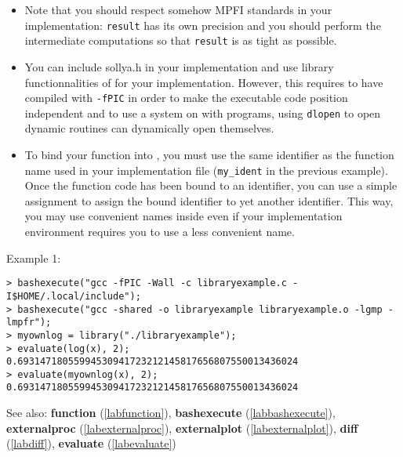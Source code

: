 \begin{itemize}
\item Note that you should respect somehow MPFI standards in your implementation:
   \verb|result| has its own precision and you should perform the 
   intermediate computations so that \verb|result| is as tight as possible.

\item You can include sollya.h in your implementation and use library 
   functionnalities of \sollya for your implementation. However, this requires to have compiled
   \sollya with \texttt{-fPIC} in order to make the \sollya executable code position 
   independent and to use a system on with programs, using \texttt{dlopen} to open
   dynamic routines can dynamically open themselves.

\item To bind your function into \sollya, you must use the same identifier as the
   function name used in your implementation file (\verb|my_ident| in the previous
   example). Once the function code has been bound to an identifier, you can use a simple assignment
   to assign the bound identifier to yet another identifier. This way, you may use convenient
   names inside \sollya even if your implementation environment requires you to use a less
   convenient name.
\end{itemize}
\noindent Example 1: 
\begin{center}\begin{minipage}{15cm}\begin{Verbatim}[frame=single]
> bashexecute("gcc -fPIC -Wall -c libraryexample.c -I$HOME/.local/include");
> bashexecute("gcc -shared -o libraryexample libraryexample.o -lgmp -lmpfr");
> myownlog = library("./libraryexample");
> evaluate(log(x), 2);
0.69314718055994530941723212145817656807550013436024
> evaluate(myownlog(x), 2);
0.69314718055994530941723212145817656807550013436024
\end{Verbatim}
\end{minipage}\end{center}
See also: \textbf{function} (\ref{labfunction}), \textbf{bashexecute} (\ref{labbashexecute}), \textbf{externalproc} (\ref{labexternalproc}), \textbf{externalplot} (\ref{labexternalplot}), \textbf{diff} (\ref{labdiff}), \textbf{evaluate} (\ref{labevaluate})
